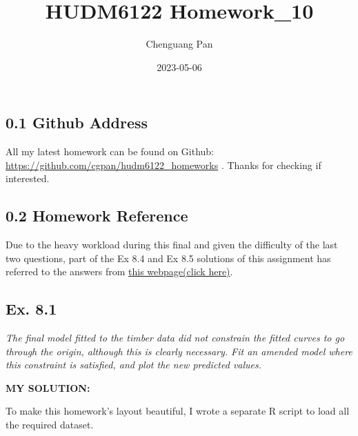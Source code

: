 \documentclass[
]{article}
\title{HUDM6122 Homework\_10}
\author{Chenguang Pan}
\date{2023-05-06}
\begin{document}
\maketitle

\hypertarget{github-address}{%
\subsection{0.1 Github Address}\label{github-address}}

All my latest homework can be found on Github:
\url{https://github.com/cgpan/hudm6122_homeworks} . Thanks for checking
if interested.

\hypertarget{homework-reference}{%
\subsection{0.2 Homework Reference}\label{homework-reference}}

Due to the heavy workload during this final and given the difficulty of
the last two questions, part of the Ex 8.4 and Ex 8.5 solutions of this
assignment has referred to the answers from
\href{https://rstudio-pubs-static.s3.amazonaws.com/529736_55aeb8cb60a44adf948c1457e6a00262.html}{this
webpage(click here)}.

\hypertarget{ex.-8.1}{%
\subsection{Ex. 8.1}\label{ex.-8.1}}

\emph{The final model fitted to the timber data did not constrain the
fitted curves to go through the origin, although this is clearly
necessary. Fit an amended model where this constraint is satisfied, and
plot the new predicted values.}

\textbf{MY SOLUTION:}

To make this homework's layout beautiful, I wrote a separate R script to
load all the required dataset.
\end{document}
